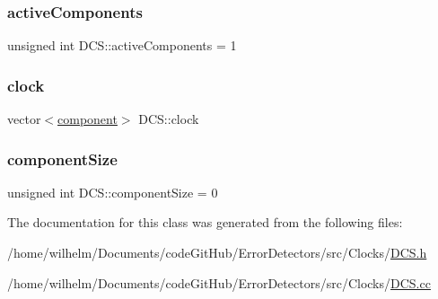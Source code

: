 \subsubsection{\texorpdfstring{active\+Components}{activeComponents}}
{\footnotesize\ttfamily unsigned int D\+C\+S\+::active\+Components = 1}

\mbox{\label{class_d_c_s_adde0f06e934657f25a92b13e04d3fd7d}} 
\subsubsection{\texorpdfstring{clock}{clock}}
{\footnotesize\ttfamily vector$<$\hyperlink{_d_c_s_8h_aff5561f7728e7d2c203fbfeac4a73866}{component}$>$ D\+C\+S\+::clock}

\mbox{\label{class_d_c_s_af256dc5d9b30241bfce2e12d57824bec}} 
\subsubsection{\texorpdfstring{component\+Size}{componentSize}}
{\footnotesize\ttfamily unsigned int D\+C\+S\+::component\+Size = 0}



The documentation for this class was generated from the following files\+:\begin{DoxyCompactItemize}
\item 
/home/wilhelm/\+Documents/code\+Git\+Hub/\+Error\+Detectors/src/\+Clocks/\hyperlink{_d_c_s_8h}{D\+C\+S.\+h}\item 
/home/wilhelm/\+Documents/code\+Git\+Hub/\+Error\+Detectors/src/\+Clocks/\hyperlink{_d_c_s_8cc}{D\+C\+S.\+cc}\end{DoxyCompactItemize}
